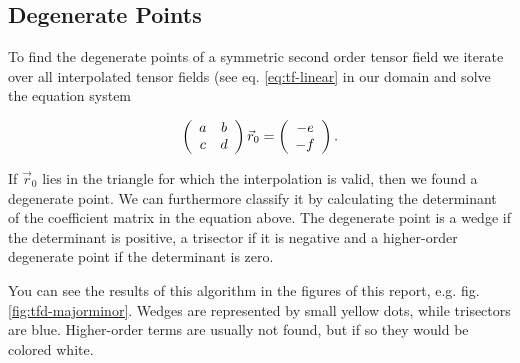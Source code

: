 \documentclass[a4paper,10pt,notitlepage]{scrartcl}
\begin{document}
\subsection{Degenerate Points}

To find the degenerate points of a symmetric second order tensor field we
iterate over all interpolated tensor fields (see eq. \ref{eq:tf-linear} in our
domain and solve the equation system

\begin{equation}
  \left(\begin{array}{c c}
         a & b \\
         c & d
        \end{array} \right)
 \vec{r}_0 = \left( \begin{array}{c} -e \\ -f \end{array} \right).
\end{equation}

If $\vec{r}_0$ lies in the triangle for which the interpolation is valid, then
we found a degenerate point. We can furthermore classify it by calculating the
determinant of the coefficient matrix in the equation above. The degenerate
point is a wedge if the determinant is positive, a trisector if it is negative
and a higher-order degenerate point if the determinant is zero.

You can see the results of this algorithm in the figures of this report, e.g.
fig. \ref{fig:tfd-majorminor}. Wedges are represented by small yellow dots,
while trisectors are blue. Higher-order terms are usually not found, but if so
they would be colored white.

  
\end{document}
